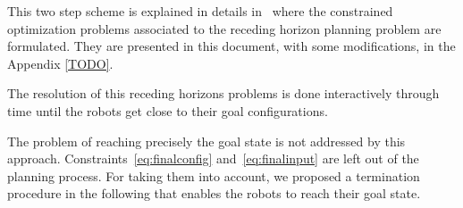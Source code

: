 This two step scheme is explained in details in~\cite{Defoort2009, Defoort2007a} where the 
constrained optimization problems associated to the receding horizon planning problem are formulated. They are presented in this document, with some modifications, in the Appendix \ref{TODO}.

The resolution of this receding horizons problems is done interactively through time until the robots get close to their goal configurations.

The problem of reaching precisely the goal state is not addressed by this approach. Constraints~\ref{eq:finalconfig} and~\ref{eq:finalinput} are left out of the planning process.
For taking them into account, we proposed a termination procedure in the following that enables the robots to reach their goal state.



%
%
%
%
%


